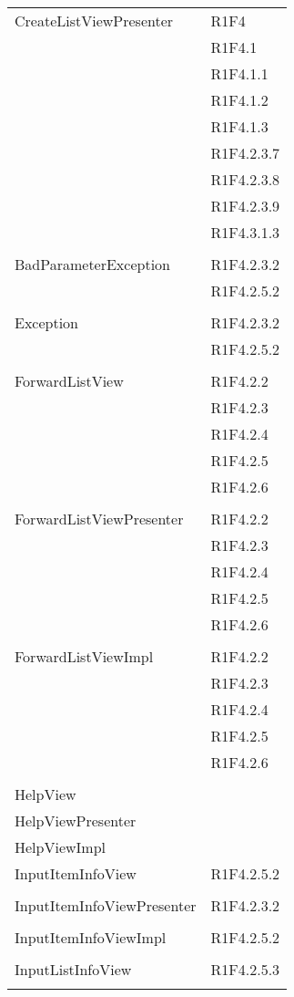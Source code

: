 \begin{center}
\begin{longtable}{|p{7cm}|p{5cm}|}
		CreateListViewPresenter & R1F4 \\ & R1F4.1 \\ & R1F4.1.1 \\ & R1F4.1.2 \\ & R1F4.1.3 \\ & R1F4.2.3.7 \\ & R1F4.2.3.8 \\ & R1F4.2.3.9 \\ & R1F4.3.1.3 \\ & \\ \hline
		BadParameterException & R1F4.2.3.2 \\ & R1F4.2.5.2 \\ & \\ \hline
		Exception & R1F4.2.3.2 \\ & R1F4.2.5.2 \\ & \\ \hline
		ForwardListView & R1F4.2.2 \\ & R1F4.2.3 \\ & R1F4.2.4 \\ & R1F4.2.5 \\ & R1F4.2.6 \\ & \\ \hline
		ForwardListViewPresenter & R1F4.2.2 \\ & R1F4.2.3 \\ & R1F4.2.4 \\ & R1F4.2.5 \\ & R1F4.2.6 \\ & \\ \hline
		ForwardListViewImpl & R1F4.2.2 \\ & R1F4.2.3 \\ & R1F4.2.4 \\ & R1F4.2.5 \\ & R1F4.2.6 \\ & \\ \hline
		HelpView & \\ \hline
		HelpViewPresenter & \\ \hline
		HelpViewImpl & \\ \hline
		InputItemInfoView & R1F4.2.5.2 \\ & \\ \hline
		InputItemInfoViewPresenter & R1F4.2.3.2 \\ & \\ \hline
		InputItemInfoViewImpl & R1F4.2.5.2 \\ & \\ \hline
		InputListInfoView & R1F4.2.5.3 \\ & \\ \hline

\end{longtable}
\end{center}
